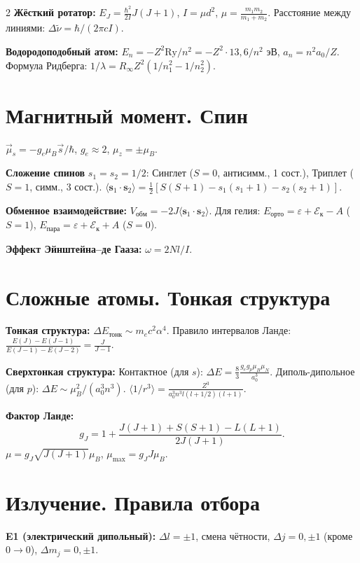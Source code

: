 \documentclass[10pt,a4paper]{article}
\begin{document}
\begin{multicols}{2}
\textbf{Жёсткий ротатор:}
$E_J = \frac{\hbar^2}{2I}J(J+1)$, $I = \mu d^2$, $\mu = \frac{m_1 m_2}{m_1+m_2}$.
Расстояние между линиями: $\Delta\tilde{\nu} = \hbar/(2\pi c I)$.

\textbf{Водородоподобный атом:}
$E_n = -Z^2\text{Ry}/n^2 = -Z^2\cdot13{,}6/n^2$ эВ,
$a_n = n^2 a_0/Z$.
Формула Ридберга: $1/\lambda = R_\infty Z^2(1/n_1^2 - 1/n_2^2)$.

\section{Магнитный момент. Спин}

$\vec{\mu}_s = -g_e\mu_B\vec{s}/\hbar$, $g_e \approx 2$, $\mu_z = \pm\mu_B$.

\textbf{Сложение спинов} $s_1 = s_2 = 1/2$:
Синглет ($S=0$, антисимм., 1 сост.), Триплет ($S=1$, симм., 3 сост.).
$\langle\mathbf{s}_1\cdot\mathbf{s}_2\rangle = \frac{1}{2}[S(S+1) - s_1(s_1+1) - s_2(s_2+1)]$.

\textbf{Обменное взаимодействие:}
$V_{\text{обм}} = -2J\langle\mathbf{s}_1\cdot\mathbf{s}_2\rangle$.
Для гелия: $E_{\text{орто}} = \varepsilon + \mathcal{E}_\text{к} - A$ ($S=1$),
$E_{\text{пара}} = \varepsilon + \mathcal{E}_\text{к} + A$ ($S=0$).

\textbf{Эффект Эйнштейна--де Гааза:} $\omega = 2Nl/I$.

\section{Сложные атомы. Тонкая структура}

\textbf{Тонкая структура:} $\Delta E_{\text{тонк}} \sim m_e c^2 \alpha^4$.
Правило интервалов Ланде: $\frac{E(J)-E(J-1)}{E(J-1)-E(J-2)} = \frac{J}{J-1}$.

\textbf{Сверхтонкая структура:}
Контактное (для $s$): $\Delta E = \frac{8}{3}\frac{g_e g_p \mu_B \mu_N}{a_0^3}$.
Диполь-дипольное (для $p$): $\Delta E \sim \mu_B^2/(a_0^3 n^3)$.
$\langle 1/r^3 \rangle = \frac{Z^3}{a_0^3 n^3 l(l+1/2)(l+1)}$.

\textbf{Фактор Ланде:}
$$g_J = 1 + \frac{J(J+1)+S(S+1)-L(L+1)}{2J(J+1)}.$$
$\mu = g_J\sqrt{J(J+1)}\mu_B$, $\mu_{\max} = g_J J \mu_B$.

\section{Излучение. Правила отбора}

\textbf{E1 (электрический дипольный):}
$\Delta l = \pm 1$, смена чётности, $\Delta j = 0,\pm1$ (кроме $0\to0$), $\Delta m_j = 0,\pm1$.


\end{multicols}
\end{document}

